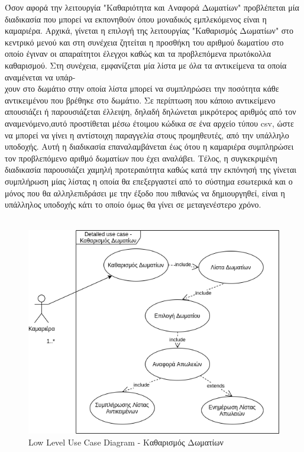 \noindent
Όσον αφορά την λειτουργία "Καθαριότητα και Αναφορά Δωματίων" προβλέπεται μία διαδικασία
που μπορεί να εκπονηθούν όπου μοναδικός εμπλεκόμενος είναι η καμαριέρα. Αρχικά, γίνεται η 
επιλογή της λειτουργίας "Καθαρισμός Δωματίων" στο κεντρικό  μενού και στη συνέχεια ζητείται 
η προσθήκη του αριθμού δωματίου στο οποίο έγιναν οι απαραίτητοι έλεγχοι καθώς και τα 
προβλεπόμενα πρωτόκολλα καθαρισμού. Στη συνέχεια, εμφανίζεται μία λίστα με όλα τα αντικείμενα
τα οποία αναμένεται να υπάρ-\\χουν στο δωμάτιο στην οποία λίστα μπορεί να συμπληρώσει 
την ποσότητα κάθε αντικειμένου που βρέθηκε στο δωμάτιο. Σε περίπτωση που κάποιο 
αντικείμενο απουσιάζει ή παρουσιάζεται έλλειψη, δηλαδή δηλώνεται μικρότερος αριθμός από 
τον αναμενόμενο,αυτό προστίθεται μέσω έτοιμου κώδικα σε ένα αρχείο τύπου csv, ώστε να 
μπορεί να γίνει η αντίστοιχη παραγγελία στους προμηθευτές, από την υπάλληλο υποδοχής.
Αυτή η διαδικασία επαναλαμβάνεται έως ότου η καμαριέρα συμπληρώσει τον προβλεπόμενο 
αριθμό δωματίων που έχει αναλάβει. Τέλος, η συγκεκριμένη διαδικασία παρουσιάζει χαμηλή 
προτεραιότητα καθώς κατά την εκπόνησή της γίνεται συμπλήρωση μίας λίστας η οποία θα 
επεξεργαστεί από το σύστημα εσωτερικά και ο μόνος που θα αλληλεπιδράσει με την έξοδο
που πιθανώς να δημιουργηθεί, είναι η υπάλληλος υποδοχής κάτι το οποίο  όμως θα γίνει σε 
μεταγενέστερο χρόνο.\\\\
\begin{figure}[H]
	\centering
	\includegraphics[width=1\textwidth]{Images/Low_level_use_case-Room cleaning}
	\caption{Low Level Use Case Diagram - Καθαρισμός Δωματίων}
	\label{Low_level_use_case - Room cleaning}
\end{figure}

